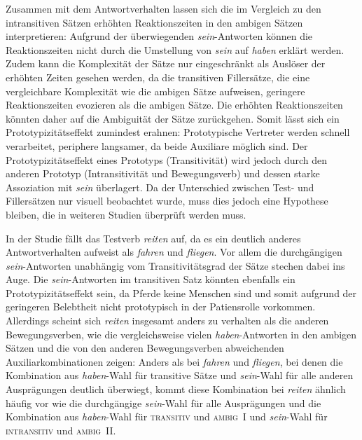 Zusammen mit dem Antwortverhalten lassen sich die im Vergleich zu den intransitiven Sätzen erhöhten Reaktionszeiten in den ambigen Sätzen interpretieren: Aufgrund der überwiegenden \textit{sein}-Antworten können die Reaktionszeiten nicht durch die Umstellung von \textit{sein} auf \textit{haben} erklärt werden. Zudem kann die Komplexität der Sätze nur eingeschränkt als Auslöser der erhöhten Zeiten gesehen werden, da die transitiven Fillersätze, die eine vergleichbare Komplexität wie die ambigen Sätze aufweisen, geringere Reaktionszeiten evozieren als die ambigen Sätze. Die erhöhten Reaktionszeiten könnten daher auf die Ambiguität der Sätze zurückgehen. Somit lässt sich ein Prototypizitätseffekt zumindest erahnen: Prototypische Vertreter werden schnell verarbeitet, periphere langsamer, da beide Auxiliare möglich sind. Der Prototypizitätseffekt eines Prototyps (Transitivität) wird jedoch durch den anderen Prototyp (Intransitivität und Bewegungsverb) und dessen starke Assoziation mit \textit{sein} überlagert. Da der Unterschied zwischen Test- und Fillersätzen nur visuell beobachtet wurde, muss dies jedoch eine Hypothese bleiben, die in weiteren Studien überprüft werden muss.

In der Studie fällt das Testverb \textit{reiten} auf, da es ein deutlich anderes Antwortverhalten aufweist als \textit{fahren} und \textit{fliegen}. Vor allem die durchgängigen \textit{sein}-Antworten unabhängig vom Transitivitätsgrad der Sätze stechen dabei ins Auge. Die \textit{sein}-Antworten im transitiven Satz könnten ebenfalls ein Prototypizitätseffekt sein, da Pferde keine Menschen sind und somit aufgrund der geringeren Belebtheit nicht prototypisch in der Patiensrolle vorkommen. Allerdings scheint sich \textit{reiten} insgesamt anders zu verhalten als die anderen Bewegungsverben, wie die vergleichsweise vielen \textit{haben}-Antworten in den ambigen Sätzen und die von den anderen Bewegungsverben abweichenden Auxiliarkombinationen zeigen: Anders als bei \textit{fahren} und \textit{fliegen}, bei denen die Kombination aus \textit{haben}-Wahl für transitive Sätze und \textit{sein}-Wahl für alle anderen Ausprägungen deutlich überwiegt, kommt diese Kombination bei \textit{reiten} ähnlich häufig vor wie die durchgängige \textit{sein}-Wahl für alle Ausprägungen und die Kombination aus \textit{haben}-Wahl für \textsc{transitiv} und \textsc{ambig~I} und \textit{sein}-Wahl für \textsc{intransitiv} und \textsc{ambig~II}. 

